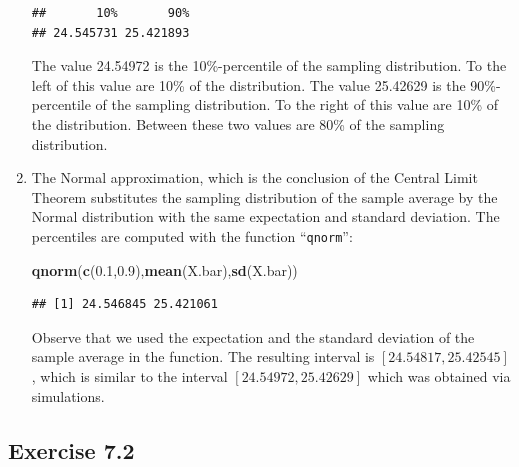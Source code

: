 \documentclass[]{krantz}
\makeatletter
\newenvironment{Shaded}{\begin{snugshade}}{\end{snugshade}}
\newcommand{\KeywordTok}[1]{\textcolor[rgb]{0.13,0.29,0.53}{\textbf{#1}}}
\newcommand{\FloatTok}[1]{\textcolor[rgb]{0.00,0.00,0.81}{#1}}
\newcommand{\NormalTok}[1]{#1}
\newenvironment{kframe}{%
\medskip{}
\setlength{\fboxsep}{.8em}
 \def\at@end@of@kframe{}%
 \ifinner\ifhmode%
  \def\at@end@of@kframe{\end{minipage}}%
  \begin{minipage}{\columnwidth}%
 \fi\fi%
 \def\FrameCommand##1{\hskip\@totalleftmargin \hskip-\fboxsep
 \colorbox{shadecolor}{##1}\hskip-\fboxsep
     \hskip-\linewidth \hskip-\@totalleftmargin \hskip\columnwidth}%
 \MakeFramed {\advance\hsize-\width
   \@totalleftmargin\z@ \linewidth\hsize
   \@setminipage}}%
 {\par\unskip\endMakeFramed%
 \at@end@of@kframe}
\renewenvironment{Shaded}{\begin{kframe}}{\end{kframe}}
\theoremstyle{definition}
\theoremstyle{definition}
\theoremstyle{definition}
\theoremstyle{remark}
\makeatother
\begin{document}
\begin{enumerate}
\begin{verbatim}
##       10%       90% 
## 24.545731 25.421893
\end{verbatim}

  The value 24.54972 is the 10\%-percentile of the sampling
  distribution. To the left of this value are 10\% of the distribution.
  The value 25.42629 is the 90\%-percentile of the sampling
  distribution. To the right of this value are 10\% of the distribution.
  Between these two values are 80\% of the sampling distribution.
\item
  The Normal approximation, which is the conclusion of the Central Limit
  Theorem substitutes the sampling distribution of the sample average by
  the Normal distribution with the same expectation and standard
  deviation. The percentiles are computed with the function
  ``\texttt{qnorm}'':

\begin{Shaded}
\begin{Highlighting}[]
\KeywordTok{qnorm}\NormalTok{(}\KeywordTok{c}\NormalTok{(}\FloatTok{0.1}\NormalTok{,}\FloatTok{0.9}\NormalTok{),}\KeywordTok{mean}\NormalTok{(X.bar),}\KeywordTok{sd}\NormalTok{(X.bar))}
\end{Highlighting}
\end{Shaded}

\begin{verbatim}
## [1] 24.546845 25.421061
\end{verbatim}

  Observe that we used the expectation and the standard deviation of the
  sample average in the function. The resulting interval is
  \([24.54817, 25.42545]\), which is similar to the interval
  \([24.54972, 25.42629]\) which was obtained via simulations.
\end{enumerate}

\subsection*{Exercise 7.2}\label{exercise-7.2}
\end{document}
